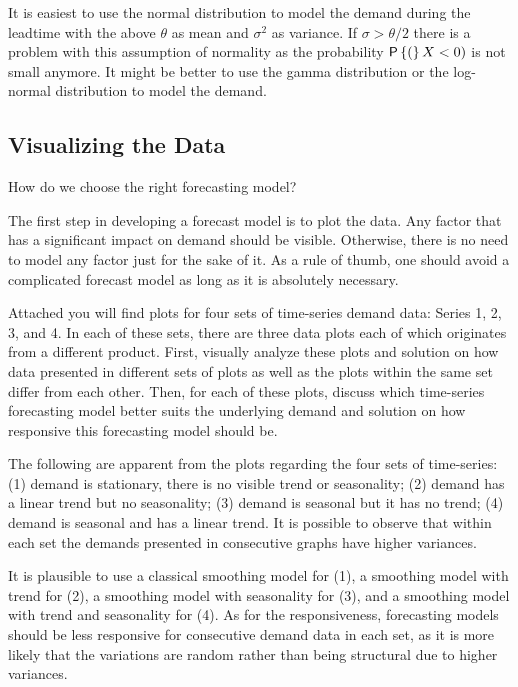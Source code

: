 \begin{question}
\begin{solution}
It is easiest to use the normal distribution to model the demand
during the leadtime with the above $\theta$ as mean and $\sigma^2$ as
variance. If $\sigma > \theta/2$ there is a problem with this
assumption of normality as the probability $\P(X<0)$ is not small
anymore. It might be better to use the gamma distribution or the
log-normal distribution to model the demand.
\end{solution}
\end{question}



\subsection{Visualizing the Data}

\begin{question}
How do we choose the right forecasting model?

  \begin{solution}
    The first step in developing a forecast model is to plot the data. Any factor that has a significant impact on demand should be visible. Otherwise, there is no need to model any factor just for the sake of it. As a rule of thumb, one should avoid a complicated forecast model as long as it is absolutely necessary. 
   
  \end{solution}
\end{question}

\begin{question} \label{plots} 
Attached you will find plots for four sets of time-series demand data: Series 1, 2, 3, and 4. In each of these sets, there are three data plots each of which originates from a different product. First, visually analyze these plots and solution on how data presented in different sets of plots as well as the plots within the same set differ from each other. Then, for each of these plots, discuss which time-series forecasting model better suits the underlying demand and solution on how responsive this forecasting model should be.

  \begin{solution}
The following are apparent from the plots regarding the four sets of time-series: (1) demand is stationary, there is no visible trend or seasonality; (2) demand has a linear trend but no seasonality; (3) demand is seasonal but it has no trend; (4) demand is seasonal and has a linear trend. It is possible to observe that within each set the demands presented in consecutive graphs have higher variances. 

It is plausible to use a classical smoothing model for (1), a smoothing model with trend for (2), a smoothing model with seasonality for (3), and a smoothing model with trend and seasonality for (4). As for the responsiveness, forecasting models should be less responsive for consecutive demand data in each set, as it is more likely that the variations are random rather than being structural due to higher variances. 
  \end{solution}
\end{question}


